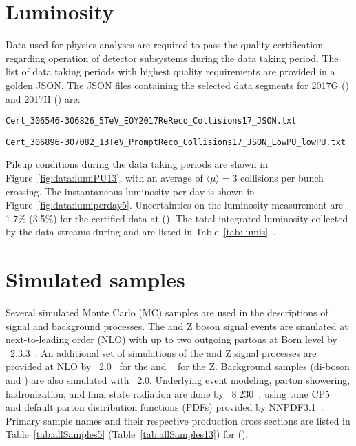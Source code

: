 \section{Luminosity}\label{ch:lumi}
Data used for physics analyses are required to pass the quality certification regarding operation of detector subsystems during the data taking period. The list of data taking periods with highest quality requirements are provided in a golden JSON. The JSON files containing the selected data segments for 2017G (\serag) and 2017H (\serah) are: \\
\centerline{\texttt{\small Cert\_306546-306826\_5TeV\_EOY2017ReReco\_Collisions17\_JSON.txt}}
\centerline{\texttt{\small Cert\_306896-307082\_13TeV\_PromptReco\_Collisions17\_JSON\_LowPU\_lowPU.txt}}
%
Pileup conditions during the data taking periods are shown in Figure~\ref{fig:data:lumiPU13}, with an average of $\langle\mu\rangle=3$ collisions per bunch crossing. The instantaneous luminosity per day is shown in Figure~\ref{fig:data:lumiperday5}. Uncertainties on the luminosity measurement are 1.7\% (3.5\%) for the certified data at \serah (\serag). The total integrated luminosity collected by the data streams during \serag and \serah are listed in Table~\ref{tab:lumis}~\cite{LumiPOGNumbers}.







\section{Simulated samples}\label{ch:data:sim}
Several simulated Monte Carlo (MC) samples are used in the descriptions of signal and background processes. The \Wpm and Z boson signal events are simulated at next-to-leading order (NLO) with up to two outgoing partons at Born level by \MGvATNLO~2.3.3~\cite{Alwall:2014hca}. An additional set of simulations of the \Wpm and Z signal processes are provided at NLO by \POWHEG~2.0~\cite{Alioli:2008gx,Frixione:2007vw,powheg:2010,Alioli:2010xd} for the \Wpm and \MINLO~\cite{Hamilton:2012rf} for the Z. Background samples (di-boson and \ttbar) are also simulated with \POWHEG~2.0. Underlying event modeling, parton showering, hadronization, and final state radiation are done by \PYTHIA~8.230~\cite{Sjostrand:2014zea}, using tune CP5~\cite{Sirunyan:2019dfx} and default parton distribution functions (PDFs) provided by NNPDF3.1~\cite{Ball:2017nwa}. Primary sample names and their respective production cross sections are listed in Table~\ref{tab:allSamples5} (Table~\ref{tab:allSamples13}) for \serag (\serah).


